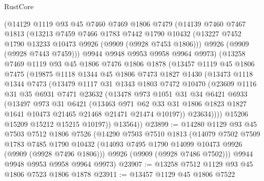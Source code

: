 \begin{lexlean}{RustCore}
\begin{coremodule}
    (@14129
      @1119
      @93
      @45
      @7460
      @7469
      @1806
      @7479
      (@14139
        @7460
        @7467
        @1813
        (@13213
          @7459
          @7466
          @1783
          @7442
          @1790
          @10432
          (@13227 @7452 @1790 @13233 @10473 @9926 (@9909 (@9928 @7453 @1806)))
          @9926
          (@9909 (@9928 @7443 @7459)))
        @9944
        @9948
        @9953
        @9958
        @9964
        @9973)
      (@13258
        @7469
        @1119
        @93
        @45
        @1806
        @7476
        @1806
        @1878
        (@13457
          @1119
          @45
          @1806
          @7475
          (@19875
            @1118
            @1344
            @45
            @1806
            @7473
            @1827
            @1430
            (@13473
              @1118
              @1344
              @7473
              (@13479
                @1117
                @31
                @1343
                @1803
                @7472
                @10470
                (@23609
                  @1116
                  @31
                  @35
                  @6931
                  @7471
                  @23632
                  (@13478
                    @973
                    @1051
                    @31
                    @34
                    @6421
                    @6933
                    (@13497
                      @973
                      @31
                      @6421
                      (@13463
                        @971
                        @62
                        @33
                        @31
                        @1806
                        @1823
                        @1827
                        @1641
                        @10473
                        @21465
                        @21468
                        @21471
                        @21474
                        @10197))
                    @23634))))
            @15206
            @15209
            @15212
            @15215
            @10197))
        @13564))
@23899 := @14280
    @1129
    @93
    @45
    @7503
    @7512
    @1806
    @7526
    (@14290
      @7503
      @7510
      @1813
      (@14079
        @7502
        @7509
        @1783
        @7485
        @1790
        @10432
        (@14093 @7495 @1790 @14099 @10473 @9926 (@9909 (@9928 @7496 @1806)))
        @9926
        (@9909 (@9928 @7486 @7502)))
      @9944
      @9948
      @9953
      @9958
      @9964
      @9973)
@23907 := @13258 @7512 @1129 @93 @45 @1806 @7523 @1806 @1878
@23911 := @13457 @1129 @45 @1806 @7522

\end{coremodule}
\end{lexlean}

